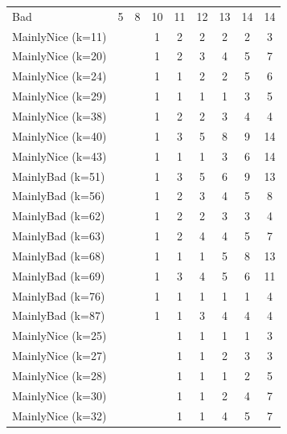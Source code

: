 \documentclass[journal,10pt,twoside]{IEEEtran}
\begin{document}
\begin{table}[ht]
\begin{minipage}{.55\textwidth}
\begin{tabular}{l|cccccccc}
        Bad                  &   5 &   8 &   10 &   11 &   12 &   13 &   14 &   14 \\
        MainlyNice (k=11)    &     &     &    1 &    2 &    2 &    2 &    2 &    3 \\
        MainlyNice (k=20)    &     &     &    1 &    2 &    3 &    4 &    5 &    7 \\
        MainlyNice (k=24)    &     &     &    1 &    1 &    2 &    2 &    5 &    6 \\
        MainlyNice (k=29)    &     &     &    1 &    1 &    1 &    1 &    3 &    5 \\
        MainlyNice (k=38)    &     &     &    1 &    2 &    2 &    3 &    4 &    4 \\
        MainlyNice (k=40)    &     &     &    1 &    3 &    5 &    8 &    9 &   14 \\
        MainlyNice (k=43)    &     &     &    1 &    1 &    1 &    3 &    6 &   14 \\
        MainlyBad (k=51)     &     &     &    1 &    3 &    5 &    6 &    9 &   13 \\
        MainlyBad (k=56)     &     &     &    1 &    2 &    3 &    4 &    5 &    8 \\
        MainlyBad (k=62)     &     &     &    1 &    2 &    2 &    3 &    3 &    4 \\
        MainlyBad (k=63)     &     &     &    1 &    2 &    4 &    4 &    5 &    7 \\
        MainlyBad (k=68)     &     &     &    1 &    1 &    1 &    5 &    8 &   13 \\
        MainlyBad (k=69)     &     &     &    1 &    3 &    4 &    5 &    6 &   11 \\
        MainlyBad (k=76)     &     &     &    1 &    1 &    1 &    1 &    1 &    4 \\
        MainlyBad (k=87)     &     &     &    1 &    1 &    3 &    4 &    4 &    4 \\
        MainlyNice (k=25)    &     &     &      &    1 &    1 &    1 &    1 &    3 \\
        MainlyNice (k=27)    &     &     &      &    1 &    1 &    2 &    3 &    3 \\
        MainlyNice (k=28)    &     &     &      &    1 &    1 &    1 &    2 &    5 \\
        MainlyNice (k=30)    &     &     &      &    1 &    1 &    2 &    4 &    7 \\
        MainlyNice (k=32)    &     &     &      &    1 &    1 &    4 &    5 &    7 \\

\end{tabular}
\end{minipage}
\end{table}
\end{document}

